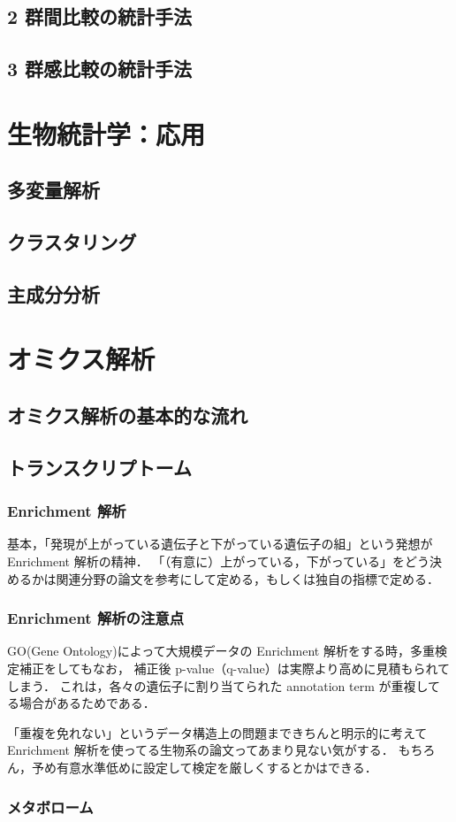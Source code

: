 \section{2 群間比較の統計手法}
\section{3 群感比較の統計手法}

\chapter{生物統計学：応用}
\section{多変量解析}
\section{クラスタリング}
\section{主成分分析}

\chapter{オミクス解析}
\section{オミクス解析の基本的な流れ}
\section{トランスクリプトーム}
\subsection{Enrichment 解析}
基本，「発現が上がっている遺伝子と下がっている遺伝子の組」という発想が Enrichment 解析の精神．
「（有意に）上がっている，下がっている」をどう決めるかは関連分野の論文を参考にして定める，もしくは独自の指標で定める．

\subsection{Enrichment 解析の注意点}

GO(Gene Ontology)によって大規模データの Enrichment 解析をする時，多重検定補正をしてもなお，
補正後 p-value（q-value）は実際より高めに見積もられてしまう．
これは，各々の遺伝子に割り当てられた annotation term が重複してる場合があるためである．

「重複を免れない」というデータ構造上の問題まできちんと明示的に考えて Enrichment 解析を使ってる生物系の論文ってあまり見ない気がする．
もちろん，予め有意水準低めに設定して検定を厳しくするとかはできる．

\subsection{メタボローム}
